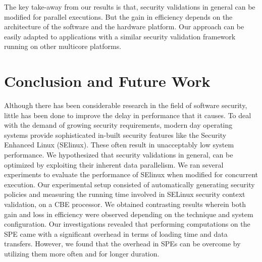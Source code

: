 \documentclass[conference]{IEEEtran}
\newcommand{\eat}[1]{}
\begin{document}
The key take-away from our results is that, security
validations in general can be modified for parallel executions. But
the gain in efficiency depends on the architecture of the software and
the hardware platform. Our approach can be easily adapted to applications with a similar security validation framework running on other multicore platforms.

\section{Conclusion and Future Work}\label{conclusion}

Although there has been considerable research in the field of software
security, little has been done to improve the delay in
performance that it causes. To deal with the demand of growing
security requirements, modern day operating systems provide
sophisticated in-built security features like the Security Enhanced
Linux (SElinux). These often result in unacceptably low system performance. We hypothesized that security validations in general,
can be optimized by exploiting their inherent data parallelism. We ran several experiments to evaluate the performance of SElinux when modified for concurrent execution. Our experimental setup consisted of automatically generating security policies and measuring the running time involved in SELinux security context validation, on a CBE processor. We obtained contrasting results wherein both gain and loss in efficiency were observed depending on the technique and system configuration. Our investigations revealed that performing computations on the SPE came with a significant overhead in terms of loading time and data transfers. However, we found that the overhead in SPEs can be overcome by utilizing them more often and for longer duration.

\eat{ The performance comparison was made under two
different parameters - the number of rules in the policies and the
presence / absence of AVC in SELinux security server module. Our
results showed that the presence of AVC ensured the performance
overhead was within an acceptable limit, but this did not hold for
policies with a reasonably large number of rules. We also observed
contrasting results with the use of parallel execution techniques, in
fact a loss in performance when compared to single core performance in
the presence of AVC. Whereas a gain in performance of up to 43\% was
measured with one of the multi-processor techniques in the absence of
AVC. Our investigations revealed that Synergistic Processing Element
(SPE) execution had a significant overhead in terms of loading time
and data transfers. However, in the absence of AVC, the SPEs were
utilized more often and long enough to overcome the delay due to
loading and data transfers and thereby register a net gain in
efficiency.}
\end{document}
